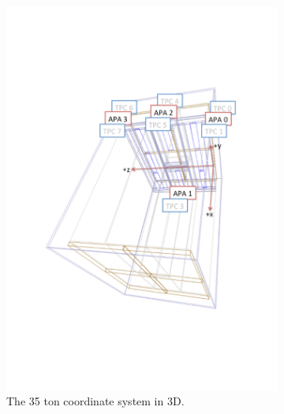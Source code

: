 \begin{figure}
  \centering
  \begin{subfigure}{0.48\textwidth}
    \centering
    \includegraphics[width=\textwidth]{35ton_APASchem}
    \caption{The 35 ton coordinate system in 3D.}
  \end{subfigure}%
  \begin{subfigure}{0.48\textwidth}
    \centering

\end{subfigure}
\end{figure}

